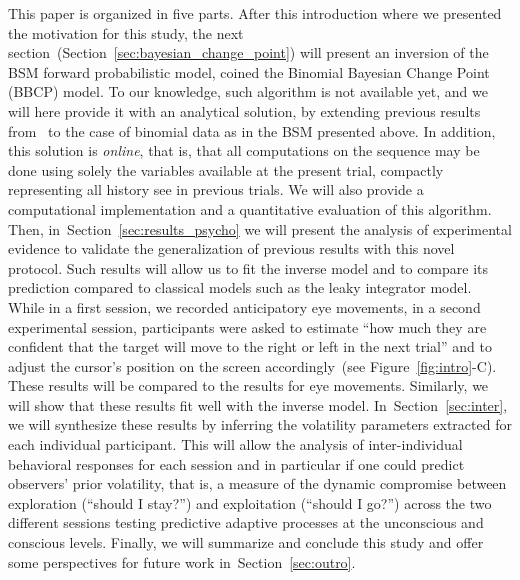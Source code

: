 \documentclass[12pt,english]{article}%
\newcommand{\citet}[1]{\textcite{#1}}
\newcommand{\seeFig}[1]{Figure~\ref{fig:#1}}
\newcommand{\seeSec}[1]{Section~\ref{sec:#1}}
\begin{document}
This paper is organized in five parts.
After this introduction where we presented the motivation for this study,
the next section~(\seeSec{bayesian_change_point}) will present
an inversion of the BSM forward probabilistic model,
coined the Binomial Bayesian Change Point (BBCP) model.
To our knowledge, such algorithm is not available yet, and
we will here provide it with an analytical solution,
by extending previous results from~\citet{AdamsMackay2007}
to the case of binomial data as in the BSM presented above.
In addition, this solution is \emph{online},
that is, that all computations on the sequence may be done
using solely the variables available at the present trial,
compactly representing all history see in previous trials.
We will also provide a computational implementation
and a quantitative evaluation of this algorithm.
Then, in~\seeSec{results_psycho} we will present the analysis of experimental evidence
to validate the generalization of previous results %
with this novel protocol. %
Such results will allow us to fit the inverse model and to compare
its prediction compared to classical models such as the leaky integrator model.
While in a first session, we recorded anticipatory eye movements, 
in a second experimental session, participants were asked to estimate
``how much they are confident that
the target will move to the right or left in the next trial'' and
to adjust the cursor's position on the screen accordingly~(see \seeFig{intro}-C).
These results will be compared to the results for eye movements.
Similarly, we will show that these results fit well
with the inverse model.
In~\seeSec{inter}, we will synthesize these results
by inferring the volatility parameters extracted
for each individual participant. %
This will allow the analysis of inter-individual behavioral responses for each session
and in particular if one could predict observers' prior volatility,
that is, a measure of the dynamic compromise between exploration (``should I stay?'')
and exploitation (``should I go?'')
across the two different sessions testing predictive adaptive processes
at the unconscious and conscious levels.
Finally, we will summarize and conclude this study and
offer some perspectives for future work in~\seeSec{outro}.
\end{document}
